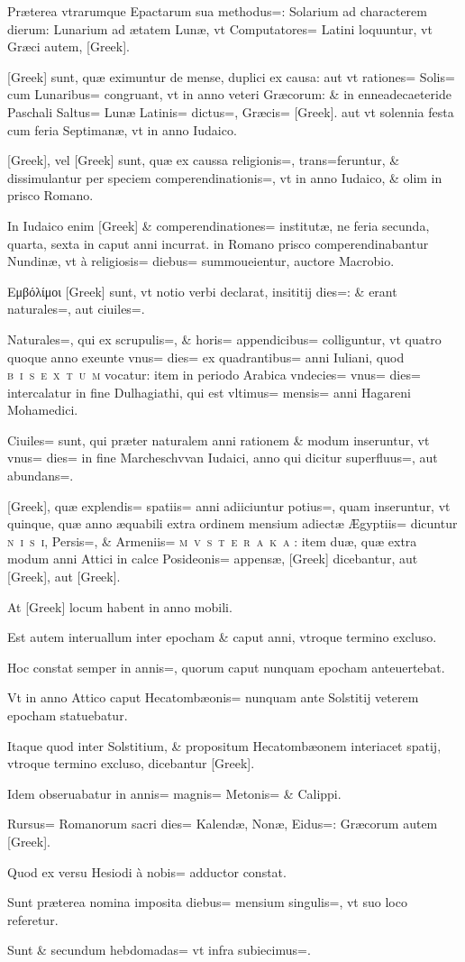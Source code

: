 \begin{parnumbers}

Præterea vtrarumque Epactarum sua methodus=: Solarium ad characterem dierum: Lunarium ad ætatem Lunæ, vt Computatores= Latini loquuntur, vt  Græci autem, [Greek].

[Greek] sunt, quæ eximuntur de mense, duplici ex causa: aut vt rationes= Solis= cum Lunaribus= congruant, vt in anno veteri Græcorum: \& in enneadecaeteride Paschali Saltus= Lunæ Latinis= dictus=, Græcis= [Greek]. aut vt solennia festa cum feria Septimanæ, vt in anno Iudaico.

[Greek], vel [Greek] sunt, quæ ex caussa religionis=, trans=feruntur, \& dissimulantur per speciem comperendinationis=, vt in anno Iudaico, \& olim in prisco Romano.

In Iudaico enim [Greek] \& comperendinationes= institutæ, ne feria secunda, quarta, sexta in caput anni incurrat. in Romano prisco comperendinabantur Nundinæ, vt à religiosis= diebus= summoueientur, auctore Macrobio.

Εμβόλίμοι [Greek] sunt, vt notio verbi declarat, insititij  dies=: \& erant naturales=, aut ciuiles=.

Naturales=, qui ex scrupulis=, \& horis= appendicibus= colliguntur, vt quatro quoque anno exeunte vnus= dies= ex quadrantibus= anni Iuliani, quod \textsc{b~i~s~e~x~t~u~m} vocatur: item in periodo Arabica vndecies= vnus= dies= intercalatur in fine Dulhagiathi, qui est vltimus= mensis= anni Hagareni Mohamedici.

Ciuiles= sunt, qui præter naturalem anni rationem \& modum inseruntur, vt vnus= dies= in fine Marcheschvvan Iudaici, anno qui dicitur superfluus=, aut abundans=.

[Greek], quæ explendis= spatiis= anni adiiciuntur potius=, quam inseruntur, vt quinque, quæ anno æquabili extra ordinem mensium adiectæ Ægyptiis= dicuntur \textsc{n~i~s~i}, Persis=, \& Armeniis= \textsc{m~v~s~t~e~r~a~k~a} : item duæ, quæ extra modum anni Attici in calce Posideonis=  appensæ, [Greek] dicebantur, aut [Greek], aut [Greek].

At [Greek] locum habent in anno mobili.

Est autem interuallum inter epocham \& caput anni, vtroque termino excluso.

Hoc constat semper in annis=, quorum caput nunquam epocham anteuertebat.

Vt in anno Attico caput Hecatombæonis= nunquam ante Solstitij veterem epocham statuebatur.

Itaque quod inter Solstitium, \& propositum Hecatombæonem interiacet spatij, vtroque termino excluso, dicebantur [Greek].

Idem obseruabatur in annis= magnis= Metonis= \& Calippi.

Rursus= Romanorum sacri dies= Kalendæ, Nonæ, Eidus=: Græcorum autem [Greek].

Quod ex versu Hesiodi à nobis= adductor constat.

Sunt præterea nomina imposita diebus= mensium  singulis=, vt suo loco referetur.

Sunt \& secundum hebdomadas= vt infra subiecimus=.
\end{parnumbers}
